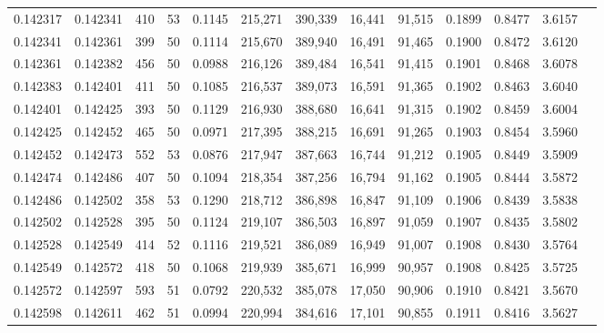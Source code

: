 \begin{tabular}{rrrrrrrrrrrrr}
0.142317 & 0.142341 &   410 &  53 &                                     0.1145 & 215,271 & 390,339 &  16,441 &  91,515 & 0.1899 & 0.8477 & 3.6157 \\
0.142341 & 0.142361 &   399 &  50 &                                     0.1114 & 215,670 & 389,940 &  16,491 &  91,465 & 0.1900 & 0.8472 & 3.6120 \\
0.142361 & 0.142382 &   456 &  50 &                                     0.0988 & 216,126 & 389,484 &  16,541 &  91,415 & 0.1901 & 0.8468 & 3.6078 \\
0.142383 & 0.142401 &   411 &  50 &                                     0.1085 & 216,537 & 389,073 &  16,591 &  91,365 & 0.1902 & 0.8463 & 3.6040 \\
0.142401 & 0.142425 &   393 &  50 &                                     0.1129 & 216,930 & 388,680 &  16,641 &  91,315 & 0.1902 & 0.8459 & 3.6004 \\
0.142425 & 0.142452 &   465 &  50 &                                     0.0971 & 217,395 & 388,215 &  16,691 &  91,265 & 0.1903 & 0.8454 & 3.5960 \\
0.142452 & 0.142473 &   552 &  53 &                                     0.0876 & 217,947 & 387,663 &  16,744 &  91,212 & 0.1905 & 0.8449 & 3.5909 \\
0.142474 & 0.142486 &   407 &  50 &                                     0.1094 & 218,354 & 387,256 &  16,794 &  91,162 & 0.1905 & 0.8444 & 3.5872 \\
0.142486 & 0.142502 &   358 &  53 &                                     0.1290 & 218,712 & 386,898 &  16,847 &  91,109 & 0.1906 & 0.8439 & 3.5838 \\
0.142502 & 0.142528 &   395 &  50 &                                     0.1124 & 219,107 & 386,503 &  16,897 &  91,059 & 0.1907 & 0.8435 & 3.5802 \\
0.142528 & 0.142549 &   414 &  52 &                                     0.1116 & 219,521 & 386,089 &  16,949 &  91,007 & 0.1908 & 0.8430 & 3.5764 \\
0.142549 & 0.142572 &   418 &  50 &                                     0.1068 & 219,939 & 385,671 &  16,999 &  90,957 & 0.1908 & 0.8425 & 3.5725 \\
0.142572 & 0.142597 &   593 &  51 &                                     0.0792 & 220,532 & 385,078 &  17,050 &  90,906 & 0.1910 & 0.8421 & 3.5670 \\
0.142598 & 0.142611 &   462 &  51 &                                     0.0994 & 220,994 & 384,616 &  17,101 &  90,855 & 0.1911 & 0.8416 & 3.5627 \\

\end{tabular}

